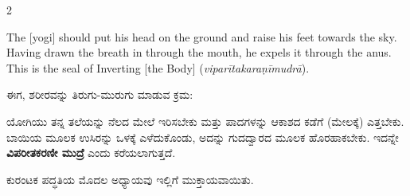\begin{multicols}{2}
\begin{eng}

The [yogi] should put his head on the ground and raise his feet towards the sky. Having drawn the breath in through the mouth, he expels it through the anus. This is the seal of Inverting [the Body] (\textit{viparītakaraṇīmudrā}).
\end{eng}
\columnbreak

\begin{kan}

ಈಗ, ಶರೀರವನ್ನು ತಿರುಗು-ಮುರುಗು ಮಾಡುವ ಕ್ರಮ:

ಯೋಗಿಯು ತನ್ನ ತಲೆಯನ್ನು ನೆಲದ ಮೇಲೆ ಇರಿಸಬೇಕು ಮತ್ತು ಪಾದಗಳನ್ನು ಆಕಾಶದ ಕಡೆಗೆ (ಮೇಲಕ್ಕೆ) ಎತ್ತಬೇಕು. ಬಾಯಿಯ ಮೂಲಕ ಉಸಿರನ್ನು ಒಳಕ್ಕೆ ಎಳೆದುಕೊಂಡು, ಅದನ್ನು ಗುದದ್ವಾರದ ಮೂಲಕ ಹೊರಹಾಕಬೇಕು. ಇದನ್ನೇ \textbf{ವಿಪರೀತಕರಣೀ ಮುದ್ರೆ} ಎಂದು ಕರೆಯಲಾಗುತ್ತದೆ.

ಕುರಂಟಕ ಪದ್ಧತಿಯ ಮೊದಲ ಅಧ್ಯಾಯವು ಇಲ್ಲಿಗೆ ಮುಕ್ತಾಯವಾಯಿತು.
\end{kan}
\end{multicols}
\vskip 0.5cm

\pushpika
\vfill
